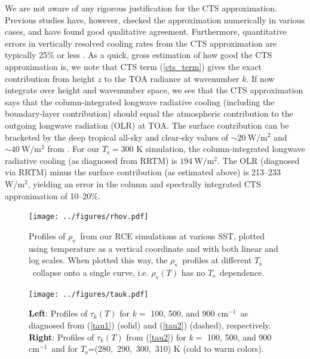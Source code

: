 \documentclass[10pt]{article}
\newcommand{\eqnref}[1]{(\ref{#1})}
\newcommand{\cminverse}{\ensuremath{\mathrm{cm^{-1}}}}
\newcommand{\Wmsq}{\ensuremath{\mathrm{W/m^2}}}
\newcommand{\rhov}{\ensuremath{\rho_\mathrm{v}}}
\newcommand{\Ts}{\ensuremath{T_\mathrm{s}}}
\begin{document}
	We are not aware of any rigorous justification for the CTS approximation. Previous studies have, however, checked the approximation numerically in various cases,  and have found good qualitative agreement. Furthermore,  quantitative errors in vertically resolved cooling rates from the CTS approximation are typically  25\% or less  \citep{clough1992, fels1975,rodgers1966}.  As a quick, gross estimation of how good the CTS approximation is, we note that CTS term \eqnref{cts_term} gives the exact contribution from height $z$ to the TOA radiance at wavenumber $k$. If now integrate over height and wavenumber space, we see that the CTS approximation says that the column-integrated longwave radiative cooling (including the boundary-layer contribution)  should equal  the atmospheric contribution to the outgoing longwave radiation (OLR) at  TOA. The surface contribution can be bracketed by the deep tropical all-sky and clear-sky values of $\sim 20 \ \Wmsq$ and $\sim 40\ \Wmsq$ from \cite{costa2012}.   For our $\Ts=300$ K simulation, the column-integrated longwave radiative cooling (as diagnosed from RRTM) is $194\ \Wmsq$. The OLR (diagnosed via RRTM) minus the surface contribution (as estimated above) is 213--233 \Wmsq , yielding an error in the column and spectrally integrated CTS approximation of 10--20\%.


	
\pagebreak

\begin{figure}[h]
	\begin{center}
			\texttt{[image: ../figures/rhov.pdf]}
		\caption{Profiles of \rhov\ from our RCE simulations at various SST, plotted using temperature as a vertical coordinate and with both linear and log scales. When plotted this way, the \rhov\ profiles at different \Ts\ collapse onto a single curve, i.e. $\rhov(T)$ has no \Ts\ dependence. 
		\label{rhov_fig}
		}
	\end{center}
\end{figure}


\begin{figure}[h]
	\begin{center}
			\texttt{[image: ../figures/tauk.pdf]}
		\caption{\textbf{Left}: Profiles of $\tau_k(T)$ for $k=$ 100, 500, and 900 \cminverse\ as diagnosed from \eqnref{tau1} (solid) and \eqnref{tau2} (dashed), respectively. \textbf{Right}: Profiles of $\tau_k(T)$ from \eqnref{tau2} for $k=$ 100, 500, and 900 \cminverse\ and for \Ts=(280,\ 290,\ 300,\ 310) K (cold to warm colors).
		\label{tauk}
		}
	\end{center}
\end{figure}
\end{document}
